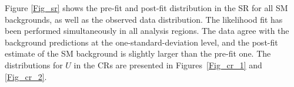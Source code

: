 Figure \ref{Fig_sr} shows the pre-fit and post-fit \MET distribution in the SR for all SM backgrounds, as well as the observed data distribution. The likelihood fit has been performed simultaneously in all analysis regions. The data agree with the background predictions at the one-standard-deviation level, and the post-fit estimate of the SM background is slightly larger than the pre-fit one. The distributions for $U$ in the CRs are presented in Figures~\ref{Fig_cr_1} and \ref{Fig_cr_2}.

\begin{figure}
\centering
  \\

\end{figure}
